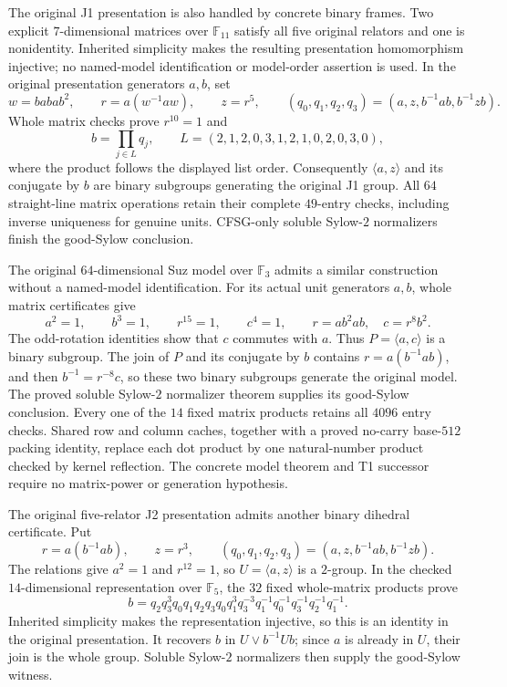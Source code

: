 The original J1 presentation is also handled by concrete binary frames.
Two explicit $7$-dimensional matrices over $\mathbb F_{11}$ satisfy all
five original relators and one is nonidentity. Inherited simplicity
makes the resulting presentation homomorphism injective; no named-model
identification or model-order assertion is used. In the original
presentation generators $a,b$, set
\[
  w=babab^2,\qquad r=a(w^{-1}aw),\qquad z=r^5,
  \qquad(q_0,q_1,q_2,q_3)=(a,z,b^{-1}ab,b^{-1}zb).
\]
Whole matrix checks prove $r^{10}=1$ and
\[
  b=\prod_{j\in L}q_j,\qquad L=(2,1,2,0,3,1,2,1,0,2,0,3,0),
\]
where the product follows the displayed list order. Consequently
$\langle a,z\rangle$ and its conjugate by $b$ are binary subgroups
generating the original J1 group. All $64$ straight-line
matrix operations retain their complete $49$-entry checks, including
inverse uniqueness for genuine units. CFSG-only soluble Sylow-$2$
normalizers finish the good-Sylow conclusion.

The original $64$-dimensional Suz model over $\mathbb F_3$ admits a
similar construction without a named-model identification. For its actual
unit generators $a,b$, whole matrix certificates give
\[
 a^2=1,\qquad b^3=1,\qquad r^{15}=1,\qquad c^4=1,
 \qquad r=ab^2ab,\quad c=r^8b^2.
\]
The odd-rotation identities show that $c$ commutes with $a$. Thus
$P=\langle a,c\rangle$ is a binary subgroup. The join of $P$ and its
conjugate by $b$ contains $r=a(b^{-1}ab)$, and then
$b^{-1}=r^{-8}c$, so these two binary subgroups generate the original
model. The proved soluble Sylow-$2$ normalizer theorem supplies its
good-Sylow conclusion. Every one of the $14$ fixed matrix products
retains all $4096$ entry checks. Shared row and column caches, together
with a proved no-carry base-$512$ packing identity, replace each dot
product by one natural-number product checked by kernel reflection.
The concrete model theorem and T1 successor require no matrix-power
or generation hypothesis.

The original five-relator J2 presentation admits another binary dihedral
certificate. Put
\[
 r=a(b^{-1}ab),\qquad z=r^3,\qquad
 (q_0,q_1,q_2,q_3)=(a,z,b^{-1}ab,b^{-1}zb).
\]
The relations give $a^2=1$ and $r^{12}=1$, so
$U=\langle a,z\rangle$ is a $2$-group. In the checked
$14$-dimensional representation over $\mathbb F_5$, the $32$ fixed
whole-matrix products prove
\[
 b=q_2q_3^3q_0q_1q_2q_3q_0q_1^3q_3^{-3}q_1^{-1}q_0^{-1}
   q_3^{-1}q_2^{-1}q_1^{-1}.
\]
Inherited simplicity makes the representation injective, so this is an
identity in the original presentation. It recovers $b$ in
$U\vee b^{-1}Ub$; since $a$ is already in $U$, their join is the whole
group. Soluble Sylow-$2$ normalizers then supply the good-Sylow witness.

